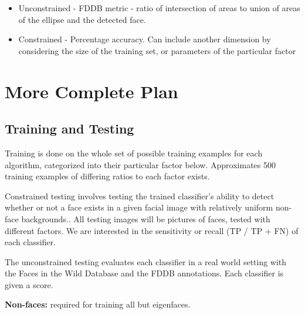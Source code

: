 \documentclass[11pt, twocolumn]{article} %
\theoremstyle{plain}
\theoremstyle{definition}
\theoremstyle{remark}
\numberwithin{equation}{section} %
\numberwithin{figure}{section} %
\numberwithin{table}{section} %
\begin{document}
\begin{itemize}
  \item Unconstrained - FDDB metric - ratio of intersection of areas to union of areas of the ellipse and the detected face.
  \item Constrained - Percentage accuracy. Can include another dimension by considering the size of the training set, or parameters of the particular factor
\end{itemize}

\clearpage
\section{More Complete Plan}

\subsection{Training and Testing}
Training is done on the whole set of possible training examples for each algorithm, categorized into their particular factor below. Approximates 500 training examples of differing ratios to each factor exists.

Constrained testing involves testing the trained classifier's ability to detect whether or not a face exists in a given facial image with relatively uniform non-face backgrounds.. All testing images will be pictures of faces, tested with different factors. We are interested in the sensitivity or recall (TP / TP + FN) of each classifier.

The unconstrained testing evaluates each classifier in a real world setting with the Faces in the Wild Database and the FDDB annotations. Each classifier is given a score.

\textbf{Non-faces:} required for training all but eigenfaces.
\end{document}
